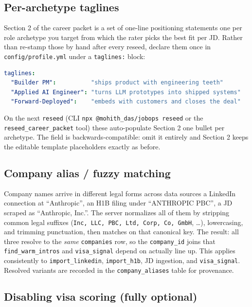 \documentclass[11pt,letterpaper]{article}
\newcommand{\tool}[1]{\texttt{#1}}
\newcommand{\fpath}[1]{\texttt{#1}}
\begin{document}
\subsection*{Per-archetype taglines}

Section 2 of the career packet is a set of one-line positioning statements \textemdash{} one per role archetype you target \textemdash{} from which the rater picks the best fit per JD. Rather than re-stamp those by hand after every reseed, declare them once in \fpath{config/profile.yml} under a \texttt{taglines:} block:

\begin{lstlisting}[language=yaml]
taglines:
  "Builder PM":          "ships product with engineering teeth"
  "Applied AI Engineer": "turns LLM prototypes into shipped systems"
  "Forward-Deployed":    "embeds with customers and closes the deal"
\end{lstlisting}

On the next \texttt{reseed} (CLI \texttt{npx @mohith\_das/jobops reseed} or the \tool{reseed\_career\_packet} tool) these auto-populate Section 2 \textemdash{} one bullet per archetype. The field is backwards-compatible: omit it entirely and Section 2 keeps the editable template placeholders exactly as before.

\subsection*{Company alias / fuzzy matching}

Company names arrive in different legal forms across data sources \textemdash{} a LinkedIn connection at ``Anthropic'', an H1B filing under ``ANTHROPIC PBC'', a JD scraped as ``Anthropic, Inc.''. The server normalizes all of them by stripping common legal suffixes (\texttt{Inc, LLC, PBC, Ltd, Corp, Co, GmbH}, \dots), lowercasing, and trimming punctuation, then matches on that canonical key. The result: all three resolve to the \emph{same} \texttt{companies} row, so the \texttt{company\_id} joins that \tool{find\_warm\_intros} and \tool{visa\_signal} depend on actually line up. This applies consistently to \tool{import\_linkedin}, \tool{import\_h1b}, JD ingestion, and \tool{visa\_signal}. Resolved variants are recorded in the \texttt{company\_aliases} table for provenance.

\subsection*{Disabling visa scoring (fully optional)}
\end{document}
